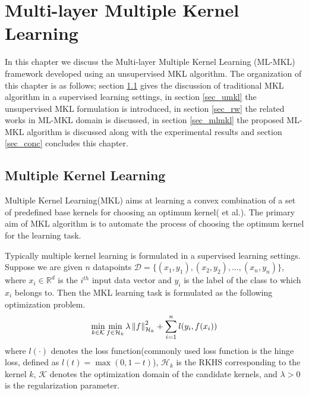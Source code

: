 \chapter{Multi-layer Multiple Kernel Learning}
\label{chap_mlmkl}
In this chapter we  discuss the Multi-layer Multiple Kernel Learning (ML-MKL) framework developed using an unsupervised MKL algorithm. The organization of this chapter is as follows;  section \ref{sec_mkl} gives  the discussion of  traditional MKL algorithm  in a supervised learning settings, in section \ref{sec_umkl} the unsupervised MKL formulation is introduced, in section \ref{sec_rw} the related works in ML-MKL domain is discussed, in section \ref{sec_mlmkl} the proposed ML-MKL algorithm is discussed along with the experimental results and section \ref{sec_conc} concludes this chapter.


\section{Multiple Kernel Learning}
\label{sec_mkl}
Multiple Kernel Learning(MKL) aims at learning a convex combination of a set of predefined base kernels for choosing an optimum kernel(\cite{mkl} et al.). The primary aim of MKL algorithm is to automate the process of choosing the optimum kernel  for the learning task.


Typically multiple kernel learning is formulated in a supervised learning settings. Suppose we are given $n$ datapoints $\mathcal{D} = \{(x_1, y_1), (x_2, y_2), \ldots, (x_n, y_n)\}$, where $x_i \in \mathbb{R}^d$ is the $i^{th}$ input data vector and $y_i$ is the label of the class to which $x_i$ belongs to. Then the MKL learning task is formulated as the following optimization problem.
\begin{equation}
\min_{k \in \mathcal{K}} \min_{f \in \mathcal{H}_k} \lambda \left\lVert f\right\rVert^2_{\mathcal{H}_k} + \sum_{i=1}^n l(y_i, f(x_i))
\end{equation}
where $l(\cdot)$ denotes the loss function(commonly used loss function is the hinge loss, defined as $l(t) = \max(0, 1-t)$), $\mathcal{H}_k$ is the RKHS corresponding to the kernel $k$, $\mathcal{K}$ denotes the optimization domain of the candidate kernels, and $\lambda > 0$ is the regularization parameter.

